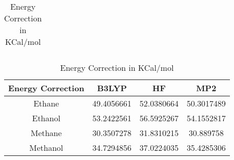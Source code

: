 \begin{table}[htbp]
\begin{subtable}[h]{\textwidth}
\begin{tabular}{|c|c|c|c|}
\end{tabular}
\caption{Vibrational Energy in KCal/mol}
\end{subtable}
\vspace{\fill}
\begin{subtable}[h]{\textwidth}
\vspace*{1 cm}
\centering
\begin{tabular}{|c|c|c|c|}
\hline
Energy Correction & B3LYP      & HF         & MP2        \\ \hline
Ethane   & 49.4056661 & 52.0380664 & 50.3017489 \\
Ethanol  & 53.2422561 & 56.5925267 & 54.1552817 \\
Methane  & 30.3507278 & 31.8310215 & 30.889758  \\
Methanol & 34.7294856 & 37.0224035 & 35.4285306 \\ \hline
\end{tabular}
\caption{Energy Correction in KCal/mol}
\end{subtable}
\end{table}
\clearpage